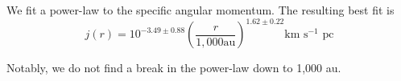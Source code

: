 We fit a power-law to the specific angular momentum. 
The resulting best fit is 
\begin{equation}
j(r) = 10^{-3.49\pm 0.88}\left( \frac{r}{1,000 \textrm{au}}\right)^{1.62\pm0.22} \textrm{km s$^{-1}$ pc}
\end{equation}
  
Notably, we do not find a break in the power-law down to 1,000 au.
  
  
  
  
  